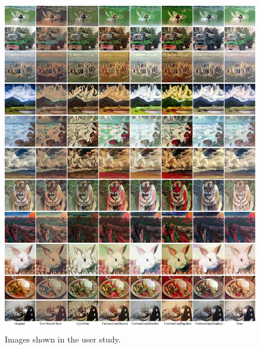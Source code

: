 \documentclass[10pt,twocolumn,letterpaper]{article}
\begin{document}
\begin{figure}[htb]
\vspace{-0.5em}
\centering
\includegraphics[width=\linewidth]{figures/userstudy2.pdf}
\caption{Images shown in the user study.}
\label{fig:userstudy2}
\end{figure}
\end{document}
